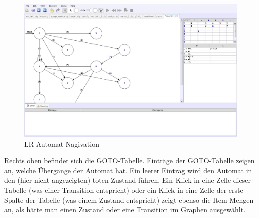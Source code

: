 \begin{figure}[h]
\begin{center}
\includegraphics[width=12cm]{../images/automaton_lr.png}
\caption{LR-Automat-Nagivation}
\end{center}
\end{figure}

Rechts oben befindet sich die GOTO-Tabelle. Einträge der GOTO-Tabelle zeigen an,
welche Übergänge der Automat hat. Ein leerer Eintrag wird den Automat in den (hier nicht angezeigten) toten Zustand führen.
Ein Klick in eine Zelle dieser Tabelle (was einer Transition entspricht) oder ein Klick in eine Zelle der erste Spalte der Tabelle (was einem Zustand entspricht) zeigt ebenso
die Item-Mengen an, als hätte man einen Zustand oder eine Transition im Graphen
ausgewählt.
